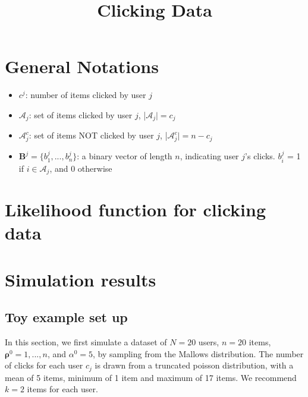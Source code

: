 \documentclass[11pt, oneside]{article}   	%
\title{Clicking Data}
\author{}
\date{}							%
\begin{document}
\maketitle
\section{General Notations}

\begin{itemize}
	
	\item {$c^j$: number of items clicked by user $j$}
	\item {$\mathcal{A}_j$: set of items clicked by user $j$, |$\mathcal{A}_j| = c_j$}
	\item {$\mathcal{A}_j^c$: set of items NOT clicked by user $j$, |$\mathcal{A}_j^c| = n-c_j$ }
	\item {$\bm{B}^j = \{b^j_1, ..., b^j_n\}$: a binary vector of length $n$, indicating user $j$'s clicks. $b^j_i$ = 1 if $i \in \mathcal{A}_j$, and 0 otherwise}
	
\end{itemize}
\section{Likelihood function for clicking data}
\section{Simulation results}
\subsection{Toy example set up}
In this section, we first simulate a dataset of $N = 20$ users, $n = 20$ items, $\bm{\rho}^0 = 1, ..., n$, and $\alpha^0 = 5$, by sampling from the Mallows distribution. The number of clicks for each user $c_j$ is drawn from a truncated poisson distribution, with a mean of 5 items, minimum of 1 item and maximum of 17 items. We recommend $ k = 2$ items for each user.  
\end{document}
